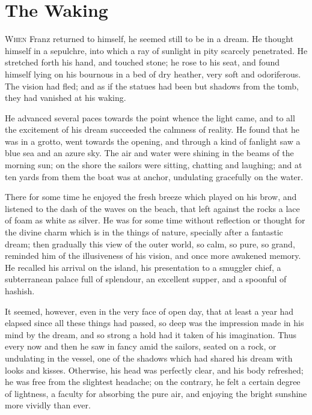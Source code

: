 \chapter{The Waking} 

 \lettrine{W}{hen} Franz returned to himself, he seemed still to be in a dream. He thought himself in a sepulchre, into which a ray of sunlight in pity scarcely penetrated. He stretched forth his hand, and touched stone; he rose to his seat, and found himself lying on his bournous in a bed of dry heather, very soft and odoriferous. The vision had fled; and as if the statues had been but shadows from the tomb, they had vanished at his waking. 

 He advanced several paces towards the point whence the light came, and to all the excitement of his dream succeeded the calmness of reality. He found that he was in a grotto, went towards the opening, and through a kind of fanlight saw a blue sea and an azure sky. The air and water were shining in the beams of the morning sun; on the shore the sailors were sitting, chatting and laughing; and at ten yards from them the boat was at anchor, undulating gracefully on the water. 

 There for some time he enjoyed the fresh breeze which played on his brow, and listened to the dash of the waves on the beach, that left against the rocks a lace of foam as white as silver. He was for some time without reflection or thought for the divine charm which is in the things of nature, specially after a fantastic dream; then gradually this view of the outer world, so calm, so pure, so grand, reminded him of the illusiveness of his vision, and once more awakened memory. He recalled his arrival on the island, his presentation to a smuggler chief, a subterranean palace full of splendour, an excellent supper, and a spoonful of hashish. 

 It seemed, however, even in the very face of open day, that at least a year had elapsed since all these things had passed, so deep was the impression made in his mind by the dream, and so strong a hold had it taken of his imagination. Thus every now and then he saw in fancy amid the sailors, seated on a rock, or undulating in the vessel, one of the shadows which had shared his dream with looks and kisses. Otherwise, his head was perfectly clear, and his body refreshed; he was free from the slightest headache; on the contrary, he felt a certain degree of lightness, a faculty for absorbing the pure air, and enjoying the bright sunshine more vividly than ever. 

